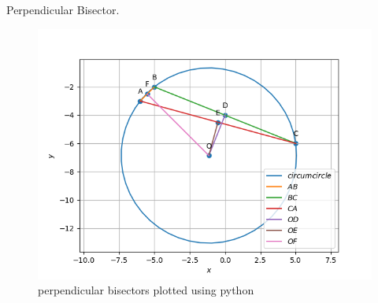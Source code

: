 \begin{table}[H]
        \centering
        
        \caption{Perpendicular Bisector.}
        \label{tab:perp_bisec}
    \end{table}
\begin{figure}[H]
\includegraphics[width=\columnwidth]{1.4/figs/14.png}
\caption{perpendicular bisectors plotted using python}
\label{fig:i_perp_bisec_py}
\end{figure}
